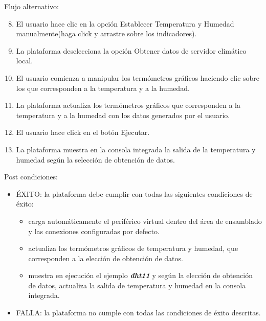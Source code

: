Flujo alternativo:
\begin{enumerate}
    \setcounter{enumi}{7}
	\item El usuario hace clic en la opción \textquotedbl Establecer Temperatura y Humedad manualmente(haga click y arrastre sobre
los indicadores).\textquotedbl
	\item La plataforma deselecciona la opción \textquotedbl Obtener datos de servidor climático local.\textquotedbl
    \item El usuario comienza a manipular los termómetros gráficos haciendo clic sobre los que corresponden a la temperatura y a la humedad.
    \item La plataforma actualiza los termómetros gráficos que corresponden a la temperatura y a la humedad con los datos generados por el usuario.

	\item El usuario hace click en el botón \textquotedbl Ejecutar\textquotedbl.
	
	\item La plataforma muestra en la consola integrada la salida de la temperatura y humedad según la selección de obtención de datos.
\end{enumerate}



Post condiciones:
\begin{itemize}
	\item ÉXITO: la plataforma debe cumplir con todas las siguientes condiciones de éxito:
	
		\begin{itemize}
	    \item  carga automáticamente el periférico virtual dentro del área de ensamblado y las conexiones configuradas por defecto.
	    
	    \item actualiza los termómetros gráficos de  temperatura y  humedad, que  corresponden a la elección de obtención de datos.

	    \item muestra en ejecución el ejemplo \textit{\textbf{dht11}} y según la elección de obtención de datos, actualiza la salida de temperatura y humedad en la consola integrada.
	    \end{itemize}
	
	\item FALLA: la plataforma no cumple con todas las condiciones de éxito descritas.
\end{itemize}

